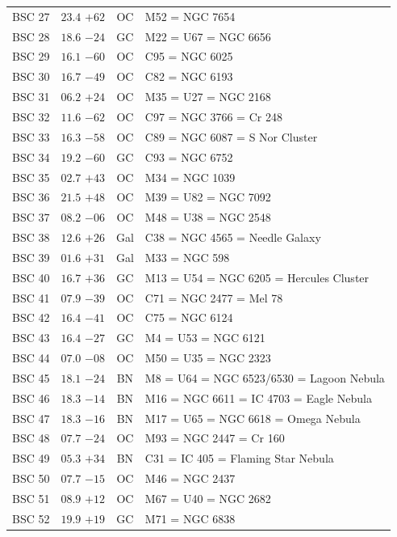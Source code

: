 \begin{table}[t]
\begin{tabularx}{\linewidth}{lccX}
BSC 27 &$23.4$ $+62$&OC &M52 = NGC 7654\\
BSC 28 &$18.6$ $-24$&GC &M22 = U67 = NGC 6656\\
BSC 29 &$16.1$ $-60$&OC &C95 = NGC 6025\\
BSC 30 &$16.7$ $-49$&OC &C82 = NGC 6193\\
BSC 31 &$06.2$ $+24$&OC &M35 = U27 = NGC 2168\\
BSC 32 &$11.6$ $-62$&OC &C97 = NGC 3766 = Cr 248\\
BSC 33 &$16.3$ $-58$&OC &C89 = NGC 6087 = S Nor Cluster\\
BSC 34 &$19.2$ $-60$&GC &C93 = NGC 6752\\
BSC 35 &$02.7$ $+43$&OC &M34 = NGC 1039\\
BSC 36 &$21.5$ $+48$&OC &M39 = U82 = NGC 7092\\
BSC 37 &$08.2$ $-06$&OC &M48 = U38 = NGC 2548\\
BSC 38 &$12.6$ $+26$&Gal&C38 = NGC 4565 = Needle Galaxy\\
BSC 39 &$01.6$ $+31$&Gal&M33 = NGC 598\\
BSC 40 &$16.7$ $+36$&GC &M13 = U54 = NGC 6205 = Hercules Cluster\\
BSC 41 &$07.9$ $-39$&OC &C71 = NGC 2477 = Mel 78\\
BSC 42 &$16.4$ $-41$&OC &C75 = NGC 6124\\
BSC 43 &$16.4$ $-27$&GC &M4 = U53 = NGC 6121\\
BSC 44 &$07.0$ $-08$&OC &M50 = U35 = NGC 2323\\
BSC 45 &$18.1$ $-24$&BN &M8 = U64 = NGC 6523/6530 = Lagoon Nebula\\
BSC 46 &$18.3$ $-14$&BN &M16 = NGC 6611 = IC 4703 = Eagle Nebula\\
BSC 47 &$18.3$ $-16$&BN &M17 = U65 = NGC 6618 = Omega Nebula\\
BSC 48 &$07.7$ $-24$&OC &M93 = NGC 2447 = Cr 160\\
BSC 49 &$05.3$ $+34$&BN &C31 = IC 405 = Flaming Star Nebula\\
BSC 50 &$07.7$ $-15$&OC &M46 = NGC 2437\\
BSC 51 &$08.9$ $+12$&OC &M67 = U40 = NGC 2682\\
BSC 52 &$19.9$ $+19$&GC &M71 = NGC 6838\\

        \hline
    \end{tabularx}
\end{table}
\clearpage


